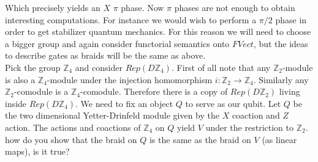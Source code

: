 \documentclass{article}
\begin{document}
Which precisely yields an $X$ $\pi$ phase. Now $\pi$ phases are not enough to obtain interesting computations. For instance we would wish to perform a $\pi/2$ phase in order to get stabilizer quantum mechanics. For this reason we will need to choose a bigger group and again consider functorial semantics onto $FVect$, but the ideas to describe gates as braids will be the same as above.\\
Pick the group $\mathbb{Z}_4$ and consider $Rep(D\mathbb{Z}_4)$. First of all note that any $\mathbb{Z}_2$-module is also a $\mathbb{Z}_4$-module under the injection homomorphism $i: \mathbb{Z}_2 \rightarrow \mathbb{Z}_4$. Similarly any $\mathbb{Z}_2$-comodule is a $\mathbb{Z}_4$-comodule. Therefore there is a copy of $Rep(D\mathbb{Z}_2)$ living inside $Rep(D\mathbb{Z}_4)$. We need to fix an object $Q$ to serve as our qubit. Let $Q$ be the two dimensional Yetter-Drinfeld module given by the $X$ coaction and $Z$ action. The actions and coactions of $\mathbb{Z}_4$ on $Q$ yield $V$ under the restriction to $\mathbb{Z}_2$.
{\color{blue} how do you show that the braid on $Q$ is the same as the braid on $V$ (as linear maps), is it true?}




\appendix
\end{document}
